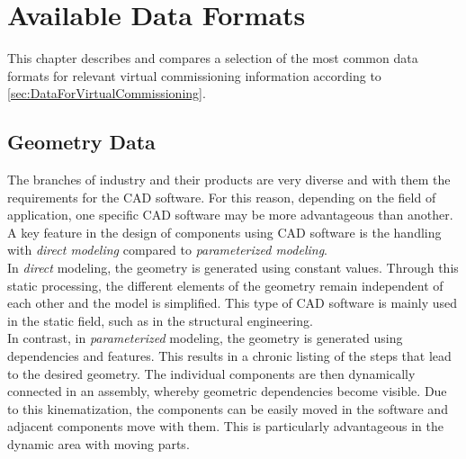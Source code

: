 \section{Available Data Formats}    \label{sec:AvailableDataFormats}
	This chapter describes and compares a selection of the most common data formats for relevant virtual commissioning information according to \autoref{sec:DataForVirtualCommissioning}. 
	

\subsection{Geometry Data}		%
	The branches of industry and their products are very diverse and with them the requirements for the CAD software. For this reason, depending on the field of application, one specific CAD software may be more advantageous than another. A key feature in the design of components using CAD software is the handling with \textit{direct modeling} compared to \textit{parameterized modeling}. \\
	
	In \textit{direct} modeling, the geometry is generated using constant values. Through this static processing, the different elements of the geometry remain independent of each other and the model is simplified. This type of CAD software is mainly used in the static field, such as in the structural engineering.  \\
	In contrast, in \textit{parameterized } modeling, the geometry is generated using dependencies and features. This results in a chronic listing of the steps that lead to the desired geometry. The individual components are then dynamically connected in an assembly, whereby geometric dependencies become visible. Due to this kinematization, the components can be easily moved in the software and adjacent components move with them. This is particularly advantageous in the dynamic area with moving parts.  \\


